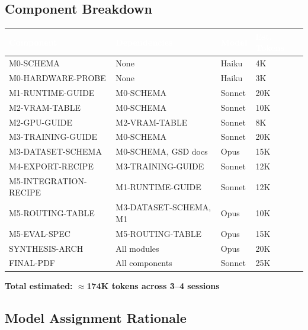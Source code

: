 \documentclass[11pt,letterpaper]{article}
\newcommand{\tableheader}[1]{\textbf{\sffamily\textcolor{white}{#1}}}
\begin{document}
\subsection{Component Breakdown}

\begin{center}
\begin{tabularx}{\textwidth}{L{3cm}L{3cm}L{2cm}C{1.5cm}}
\toprule
{}
\tableheader{Component} & \tableheader{Dependencies} & \tableheader{Model} & \tableheader{Est. Tokens} \\
\midrule
M0-SCHEMA & None & Haiku & 4K \\
M0-HARDWARE-PROBE & None & Haiku & 3K \\
M1-RUNTIME-GUIDE & M0-SCHEMA & Sonnet & 20K \\
M2-VRAM-TABLE & M0-SCHEMA & Sonnet & 10K \\
M2-GPU-GUIDE & M2-VRAM-TABLE & Sonnet & 8K \\
M3-TRAINING-GUIDE & M0-SCHEMA & Sonnet & 20K \\
M3-DATASET-SCHEMA & M0-SCHEMA, GSD docs & Opus & 15K \\
M4-EXPORT-RECIPE & M3-TRAINING-GUIDE & Sonnet & 12K \\
M5-INTEGRATION-RECIPE & M1-RUNTIME-GUIDE & Sonnet & 12K \\
M5-ROUTING-TABLE & M3-DATASET-SCHEMA, M1 & Opus & 10K \\
M5-EVAL-SPEC & M5-ROUTING-TABLE & Opus & 15K \\
SYNTHESIS-ARCH & All modules & Opus & 20K \\
FINAL-PDF & All components & Sonnet & 25K \\
\bottomrule
\end{tabularx}
\end{center}

\textbf{Total estimated: $\approx$174K tokens across 3--4 sessions}

\subsection{Model Assignment Rationale}
\end{document}
